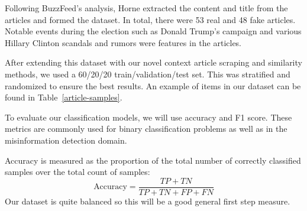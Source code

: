 \documentclass{article}
\begin{document}
Following BuzzFeed's analysis, Horne extracted the content and title from the articles and formed the dataset. In total, there were 53 real and 48 fake articles. Notable events during the election such as Donald Trump's campaign and various Hillary Clinton scandals and rumors were features in the articles.

After extending this dataset with our novel context article scraping and similarity methods, we used a 60/20/20 train/validation/test set. This was stratified and randomized to ensure the best results. An example of items in our dataset can be found in Table~\ref{article-samples}.

\begin{table}
  \begin{center}
  \end{center}
  \caption{A sample of one fake and real article in our dataset. The article ID, title and content are shown in the rows. Both articles are regarding a scandal with Hillary Clinton using a private server to store emails. The fake article reports on an event that never happens whereas the real article reports the true event -- that Clinton was exonerated from criminality.}
  \label{article-samples}
\end{table}


To evaluate our classification models, we will use accuracy and F1 score. These metrics are commonly used for binary classification problems as well as in the misinformation detection domain.

Accuracy is measured as the proportion of the total number of correctly classified samples over the total count of samples:
$$\text{Accuracy} = \frac{TP + TN}{TP + TN + FP + FN}$$
Our dataset is quite balanced so this will be a good general first step measure.
\end{document}
